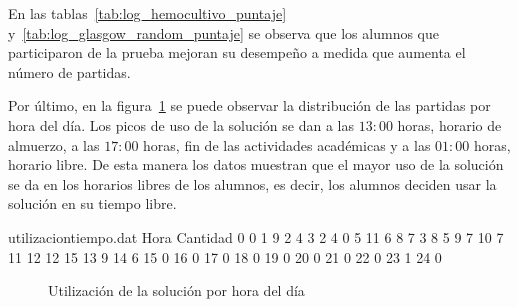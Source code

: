 En las tablas~\ref{tab:log_hemocultivo_puntaje}
y~\ref{tab:log_glasgow_random_puntaje} se observa que los alumnos que participaron de la prueba
mejoran su desempeño a medida que aumenta el número de partidas. 


Por último, en la figura~\ref{fig:utilizacion_hora} se puede observar la distribución de 
las partidas por hora del día. Los picos de uso de la solución se dan a las $13:00$ horas, 
horario de almuerzo, a las $17:00$ horas, fin de las actividades académicas y a las $01:00$ horas, 
horario libre. De esta manera los datos muestran que el mayor uso de la solución se da en los 
horarios libres de los alumnos, es decir, los alumnos deciden usar la solución en su tiempo libre.

\begin{filecontents}{utilizaciontiempo.dat}
Hora	Cantidad
 0	 0
 1	 9
 2	 4
 3	 2
 4	 0
 5	11
 6	 8
 7	 3
 8	 5
 9	 7
10	 7
11	12
12	15
13	 9
14	 6
15	 0
16	 0
17	 0
18	 0
19	 0
20	 0
21	 0
22	 0
23	 1
24	 0
\end{filecontents}

\begin{figure}[H]
	\centering
    \caption{Utilización de la solución por hora del día}
    \label{fig:utilizacion_hora}
\end{figure}
